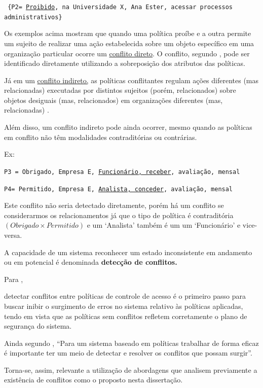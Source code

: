 \documentclass[
	12pt,				%
	openright,			%
	oneside,			%
	a4paper,			%
	english,			%
	french,				%
	spanish,			%
	brazil				%
	]{abntex2}
\begin{document}
{\scriptsize \texttt{ \{P2= {\underline{Proibido}, na Universidade X, Ana Ester, acessar processos administrativos\} }}}

Os exemplos acima mostram que quando uma política proíbe e a outra permite um sujeito de realizar uma ação estabelecida sobre um objeto específico em uma organização particular ocorre um \underline{conflito direto}. O conflito, segundo , pode ser identificado diretamente utilizando a sobreposição dos atributos das políticas.

Já em um \underline{conflito indireto,} as políticas conflitantes regulam ações diferentes (mas relacionadas) executadas por distintos sujeitos (porém, relacionados) sobre objetos desiguais (mas, relacionados) em organizações diferentes (mas, relacionadas) \cite[p.24]{sarkis2017}.

Além disso, um conflito indireto pode ainda ocorrer, mesmo quando as políticas em conflito não têm modalidades contraditórias ou contrárias.

Ex:

{\scriptsize \texttt{P3 = {Obrigado, Empresa E, \underline{Funcionário, receber}, avaliação, mensal}}}

{\scriptsize \texttt{P4= {Permitido, Empresa E, \underline{Analista, conceder}, avaliação, mensal}}}

Este conflito não seria detectado diretamente, porém há um conflito se considerarmos os relacionamentos já que o tipo de política é contraditória $(Obrigado \times Permitido)$ e um `Analista' também é um um `Funcionário' e vice-versa.

A capacidade de um sistema reconhecer um estado inconsistente em andamento ou em potencial é denominada \textbf{detecção de conflitos.}

Para ,
\begin{citacao}
	detectar conflitos entre políticas de controle de acesso é o primeiro passo para buscar inibir o surgimento de erros no sistema relativo às políticas aplicadas, tendo em vista que as políticas sem conflitos refletem corretamente o plano de segurança do sistema.
\end{citacao}

Ainda segundo , ``Para um sistema baseado em políticas trabalhar de forma eficaz é importante ter um meio de detectar e resolver os conflitos que possam surgir''. 

Torna-se, assim, relevante a utilização de abordagens que analisem previamente a existência de conflitos como o proposto nesta dissertação.
\end{document}
